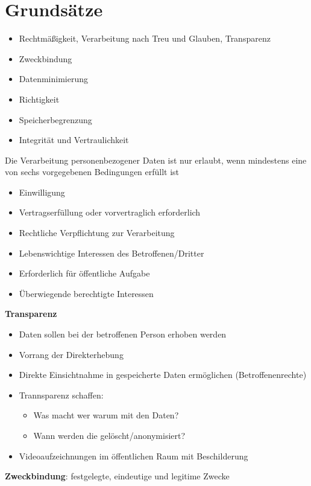 \documentclass[12pt,a4paper]{article}
\begin{document}
    \section{Grundsätze}
    \begin{itemize}
        \item Rechtmäßigkeit, Verarbeitung nach Treu und Glauben, Transparenz
        \item Zweckbindung
        \item Datenminimierung
        \item Richtigkeit
        \item Speicherbegrenzung
        \item Integrität und Vertraulichkeit
    \end{itemize}
    Die Verarbeitung personenbezogener Daten ist nur erlaubt, wenn mindestens eine von sechs vorgegebenen Bedingungen erfüllt ist
    \begin{itemize}
        \item Einwilligung
        \item Vertragserfüllung oder vorvertraglich erforderlich
        \item Rechtliche Verpflichtung zur Verarbeitung
        \item Lebenswichtige Interessen des Betroffenen/Dritter
        \item Erforderlich für öffentliche Aufgabe
        \item Überwiegende berechtigte Interessen
    \end{itemize}
    \textbf{Transparenz}
    \begin{itemize}
        \item Daten sollen bei der betroffenen Person erhoben werden
        \item Vorrang der Direkterhebung
        \item Direkte Einsichtnahme in gespeicherte Daten ermöglichen (Betroffenenrechte)
        \item Trannsparenz schaffen:
            \begin{itemize}
                \item Was macht wer warum mit den Daten?
                \item Wann werden die gelöscht/anonymisiert?
            \end{itemize}
        \item Videoaufzeichnungen im öffentlichen Raum mit Beschilderung
    \end{itemize}
    \textbf{Zweckbindung}: 
        festgelegte, eindeutige und legitime Zwecke \\ \\
\end{document}
